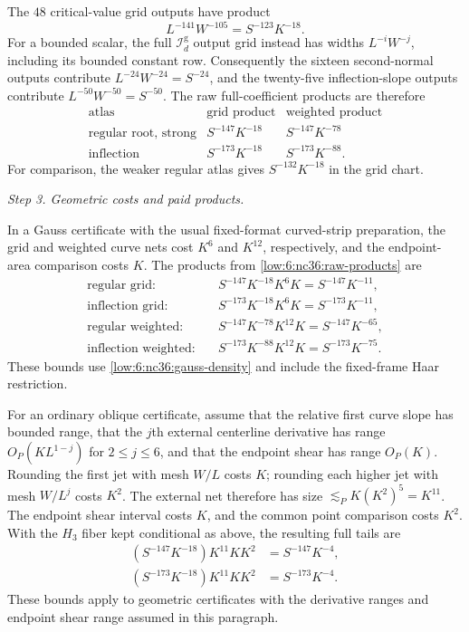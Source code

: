 \documentclass[11pt]{amsart}
\theoremstyle{definition}
\theoremstyle{remark}
\numberwithin{equation}{section}
\begin{document}
The $48$ critical-value grid outputs have product
\[
L^{-141}W^{-105}=S^{-123}K^{-18}.
\]
For a bounded scalar, the full $\mathcal I_d^{\mathrm g}$ output grid instead has widths $L^{-i}W^{-j}$, including its bounded constant row. Consequently the sixteen second-normal outputs contribute $L^{-24}W^{-24}=S^{-24}$, and the twenty-five inflection-slope outputs contribute $L^{-50}W^{-50}=S^{-50}$. The raw full-coefficient products are therefore
\begin{equation}\label{low:6:nc36:raw-products}
 \begin{array}{c|c|c}
 \text{atlas}&\text{grid product}&\text{weighted product}\\ \hline
 \text{regular root, strong}&S^{-147}K^{-18}&S^{-147}K^{-78}\\
 \text{inflection}&S^{-173}K^{-18}&S^{-173}K^{-88}.
 \end{array}
\end{equation}
For comparison, the weaker regular atlas gives $S^{-132}K^{-18}$ in the grid chart. 

\par\smallskip\noindent\textit{Step 3. Geometric costs and paid products.}\par\nobreak\smallskip

In a Gauss certificate with the usual fixed-format curved-strip preparation, the grid and weighted curve nets cost $K^6$ and $K^{12}$, respectively, and the endpoint-area comparison costs $K$. The products from \eqref{low:6:nc36:raw-products} are
\[
\begin{aligned}
\text{regular grid:}\quad&S^{-147}K^{-18}K^6K=S^{-147}K^{-11},\\
\text{inflection grid:}\quad&S^{-173}K^{-18}K^6K=S^{-173}K^{-11},\\
\text{regular weighted:}\quad&S^{-147}K^{-78}K^{12}K=S^{-147}K^{-65},\\
\text{inflection weighted:}\quad&S^{-173}K^{-88}K^{12}K=S^{-173}K^{-75}.
\end{aligned}
\]
These bounds use \eqref{low:6:nc36:gauss-density} and include the fixed-frame Haar restriction.

For an ordinary oblique certificate, assume that the relative first curve slope has bounded range, that the $j$th external centerline derivative has range $O_P(KL^{1-j})$ for $2\le j\le6$, and that the endpoint shear has range $O_P(K)$. Rounding the first jet with mesh $W/L$ costs $K$; rounding each higher jet with mesh $W/L^j$ costs $K^2$. The external net therefore has size $\lesssim_P K(K^2)^5=K^{11}$. The endpoint shear interval costs $K$, and the common point comparison costs $K^2$. With the $H_3$ fiber kept conditional as above, the resulting full tails are
\begin{equation}\label{low:6:nc36:paid-products}
\begin{aligned}
(S^{-147}K^{-18})K^{11}KK^2&=S^{-147}K^{-4},\\
(S^{-173}K^{-18})K^{11}KK^2&=S^{-173}K^{-4}.
\end{aligned}
\end{equation}
These bounds apply to geometric certificates with the derivative ranges and endpoint shear range assumed in this paragraph. 
\end{document}
